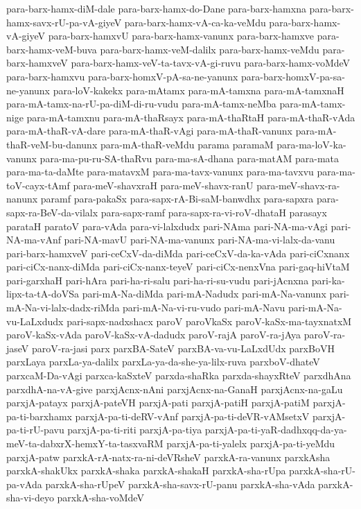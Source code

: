{para-barx-hamx-diM-dale
para-barx-hamx-do-Dane
para-barx-hamxna
para-barx-hamx-savx-rU-pa-vA-giyeV
para-barx-hamx-vA-ca-ka-veMdu
para-barx-hamx-vA-giyeV
para-barx-hamxvU
para-barx-hamx-vanunx
para-barx-hamxve
para-barx-hamx-veM-buva
para-barx-hamx-veM-dalilx
para-barx-hamx-veMdu
para-barx-hamxveV
para-barx-hamx-veV-ta-tavx-vA-gi-ruvu
para-barx-hamx-voMdeV
para-barx-hamxvu
para-barx-homxV-pA-sa-ne-yanunx
para-barx-homxV-pa-sa-ne-yanunx
para-loV-kakekx
para-mAtamx
para-mA-tamxna
para-mA-tamxnaH
para-mA-tamx-na-rU-pa-diM-di-ru-vudu
para-mA-tamx-neMba
para-mA-tamx-nige
para-mA-tamxnu
para-mA-thaRsayx
para-mA-thaRtaH
para-mA-thaR-vAda
para-mA-thaR-vA-dare
para-mA-thaR-vAgi
para-mA-thaR-vanunx
para-mA-thaR-veM-bu-danunx
para-mA-thaR-veMdu
parama
paramaM
para-ma-loV-ka-vanunx
para-ma-pu-ru-SA-thaRvu
para-ma-sA-dhana
para-matAM
para-mata
para-ma-ta-daMte
para-matavxM
para-ma-tavx-vanunx
para-ma-tavxvu
para-ma-toV-cayx-tAmf
para-meV-shavxraH
para-meV-shavx-ranU
para-meV-shavx-ra-nanunx
paramf
para-pakaSx
para-sapx-rA-Bi-saM-banwdhx
para-sapxra
para-sapx-ra-BeV-da-vilalx
para-sapx-ramf
para-sapx-ra-vi-roV-dhataH
parasayx
parataH
paratoV
para-vAda
para-vi-lalxdudx
pari-NAma
pari-NA-ma-vAgi
pari-NA-ma-vAnf
pari-NA-mavU
pari-NA-ma-vanunx
pari-NA-ma-vi-lalx-da-vanu
pari-barx-hamxveV
pari-ceCxV-da-diMda
pari-ceCxV-da-ka-vAda
pari-ciCxnanx
pari-ciCx-nanx-diMda
pari-ciCx-nanx-teyeV
pari-ciCx-nenxVna
pari-gaq-hiVtaM
pari-garxhaH
pari-hAra
pari-ha-ri-salu
pari-ha-ri-su-vudu
pari-jAcnxna
pari-ka-lipx-ta-tA-doVSa
pari-mA-Na-diMda
pari-mA-Nadudx
pari-mA-Na-vanunx
pari-mA-Na-vi-lalx-dadx-riMda
pari-mA-Na-vi-ru-vudo
pari-mA-Navu
pari-mA-Na-vu-LaLxdudx
pari-sapx-nadxshacx
paroV
paroVkaSx
paroV-kaSx-ma-tayxnatxM
paroV-kaSx-vAda
paroV-kaSx-vA-dadudx
paroV-rajA
paroV-ra-jAya
paroV-ra-jaseV
paroV-ra-jasi
parx
parxBA-SateV
parxBA-va-vu-LaLxdUdx
parxBoVH
parxLaya
parxLa-ya-dalilx
parxLa-ya-da-she-ya-lilx-ruva
parxboV-dhateV
parxcaM-Da-vAgi
parxca-kaSxteV
parxda-shaRka
parxda-shayxRteV
parxdhAna
parxdhA-na-vA-give
parxjAcnx-nAni
parxjAcnx-na-GanaH
parxjAcnx-na-gaLu
parxjA-patayx
parxjA-pateVH
parxjA-pati
parxjA-patiH
parxjA-patiM
parxjA-pa-ti-barxhamx
parxjA-pa-ti-deRV-vAnf
parxjA-pa-ti-deVR-vAMsetxV
parxjA-pa-ti-rU-pavu
parxjA-pa-ti-riti
parxjA-pa-tiya
parxjA-pa-ti-yaR-dadhxqq-da-ya-meV-ta-dabxrX-hemxY-ta-tasxvaRM
parxjA-pa-ti-yalelx
parxjA-pa-ti-yeMdu
parxjA-patw
parxkA-rA-natx-ra-ni-deVRsheV
parxkA-ra-vanunx
parxkAsha
parxkA-shakUkx
parxkA-shaka
parxkA-shakaH
parxkA-sha-rUpa
parxkA-sha-rU-pa-vAda
parxkA-sha-rUpeV
parxkA-sha-savx-rU-panu
parxkA-sha-vAda
parxkA-sha-vi-deyo
parxkA-sha-voMdeV
}
